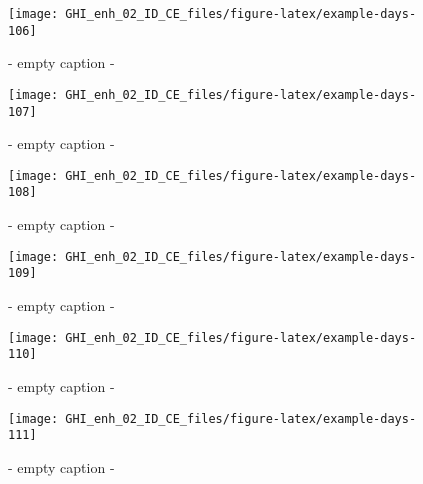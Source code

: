 \documentclass[
  10pt,
  a4paper,oneside]{article}
\begin{document}
\begin{figure}[H]

{\centering \texttt{[image: GHI\_enh\_02\_ID\_CE\_files/figure-latex/example-days-106]} 

}

\caption{ - empty caption - }\label{fig:example-days-106}
\end{figure}

\begin{figure}[H]

{\centering \texttt{[image: GHI\_enh\_02\_ID\_CE\_files/figure-latex/example-days-107]} 

}

\caption{ - empty caption - }\label{fig:example-days-107}
\end{figure}

\begin{figure}[H]

{\centering \texttt{[image: GHI\_enh\_02\_ID\_CE\_files/figure-latex/example-days-108]} 

}

\caption{ - empty caption - }\label{fig:example-days-108}
\end{figure}

\begin{figure}[H]

{\centering \texttt{[image: GHI\_enh\_02\_ID\_CE\_files/figure-latex/example-days-109]} 

}

\caption{ - empty caption - }\label{fig:example-days-109}
\end{figure}

\begin{figure}[H]

{\centering \texttt{[image: GHI\_enh\_02\_ID\_CE\_files/figure-latex/example-days-110]} 

}

\caption{ - empty caption - }\label{fig:example-days-110}
\end{figure}

\begin{figure}[H]

{\centering \texttt{[image: GHI\_enh\_02\_ID\_CE\_files/figure-latex/example-days-111]} 

}

\caption{ - empty caption - }\label{fig:example-days-111}
\end{figure}
\end{document}
